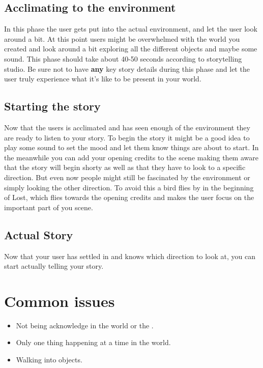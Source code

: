 \documentclass{report}
\begin{document}
				\subsection{Acclimating to the environment}
				In this phase the user gets put into the actual environment, and let the user look around a bit. At this point users might be overwhelmed with the world you created and look around a bit exploring all the different objects and maybe some sound. This phase should take about 40-50 seconds according to storytelling studio. Be sure not to have \textbf{any} key story details during this phase and let the user truly experience what it's like to be present in your world.
				
				\subsection{Starting the story}
				Now that the users is acclimated and has seen enough of the environment they are ready to listen to your story. To begin the story it might be a good idea to play some sound to set the mood and let them know things are about to start. In the meanwhile you can add your opening credits to the scene making them aware that the story will begin shorty as well as that they have to look to a specific direction. But even now people might still be fascinated by the environment or simply looking the other direction. To avoid this a bird flies by in the beginning of Lost, which flies towards the opening credits and makes the user focus on the important part of you scene.
				
				\subsection{Actual Story}
				Now that your user has settled in and knows which direction to look at, you can start actually telling your story.

				
				\section{Common issues}
				
				
				
				\begin{itemize}
					\item Not being acknowledge in the world or the .
					\item Only one thing happening at a time in the world.
					\item Walking into objects.
				\end{itemize}
				
\end{document}

